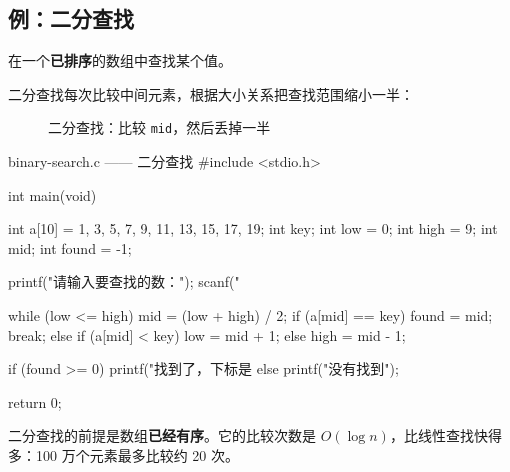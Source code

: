 \subsection{例：二分查找}

\begin{example}
在一个\textbf{已排序}的数组中查找某个值。
\end{example}
\begin{solution}
二分查找每次比较中间元素，根据大小关系把查找范围缩小一半：

\begin{figure}[htbp]
  \centering
  \caption{二分查找：比较 \texttt{mid}，然后丢掉一半}
  \label{fig:binary-search}
\end{figure}

\begin{codebox}{binary-search.c —— 二分查找}
#include <stdio.h>

int main(void)
{
    int a[10] = {1, 3, 5, 7, 9, 11, 13, 15, 17, 19};
    int key;
    int low = 0;
    int high = 9;
    int mid;
    int found = -1;

    printf("请输入要查找的数：");
    scanf("%

    while (low <= high) {
        mid = (low + high) / 2;
        if (a[mid] == key) {
            found = mid;
            break;
        } else if (a[mid] < key) {
            low = mid + 1;
        } else {
            high = mid - 1;
        }
    }

    if (found >= 0) {
        printf("找到了，下标是 %
    } else {
        printf("没有找到\n");
    }

    return 0;
}
\end{codebox}

二分查找的前提是数组\textbf{已经有序}。它的比较次数是 $O(\log n)$，比线性查找快得多：100 万个元素最多比较约 20 次。
\end{solution}

